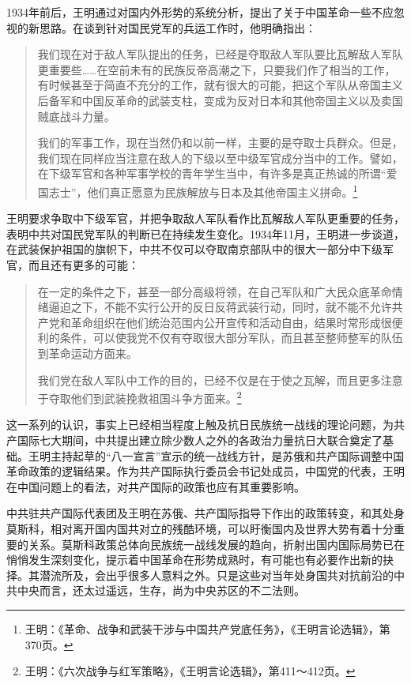 1934年前后，王明通过对国内外形势的系统分析，提出了关于中国革命一些不应忽视的新思路。在谈到针对国民党军的兵运工作时，他明确指出：

\begin{quote}

我们现在对于敌人军队提出的任务，已经是夺取敌人军队要比瓦解敌人军队更重要些……在空前未有的民族反帝高潮之下，只要我们作了相当的工作，有时候甚至于简直不充分的工作，就有很大的可能，把这个军队从帝国主义后备军和中国反革命的武装支柱，变成为反对日本和其他帝国主义以及卖国贼底战斗力量。

我们的军事工作，现在当然仍和以前一样，主要的是夺取士兵群众。但是，我们现在同样应当注意在敌人的下级以至中级军官成分当中的工作。譬如，在下级军官和各种军事学校的青年学生当中，有许多是真正热诚的所谓“爱国志士”，他们真正愿意为民族解放与日本及其他帝国主义拼命。\footnote{王明：《革命、战争和武装干涉与中国共产党底任务》，《王明言论选辑》，第370页。}
\end{quote}


王明要求争取中下级军官，并把争取敌人军队看作比瓦解敌人军队更重要的任务，表明中共对国民党军队的判断已在持续发生变化。1934年11月，王明进一步谈道，在武装保护祖国的旗帜下，中共不仅可以夺取南京部队中的很大一部分中下级军官，而且还有更多的可能：

\begin{quote}

在一定的条件之下，甚至一部分高级将领，在自己军队和广大民众底革命情绪逼迫之下，不能不实行公开的反日反蒋武装行动，同时，就不能不允许共产党和革命组织在他们统治范围内公开宣传和活动自由，结果时常形成很便利的条件，可以使我党不仅有夺取很大部分军队，而且甚至整师整军的队伍到革命运动方面来。

我们党在敌人军队中工作的目的，已经不仅是在于使之瓦解，而且更多注意于夺取他们到武装挽救祖国斗争方面来。\footnote{王明：《六次战争与红军策略》，《王明言论选辑》，第411～412页。}
\end{quote}


这一系列的认识，事实上已经相当程度上触及抗日民族统一战线的理论问题，为共产国际七大期间，中共提出建立除少数人之外的各政治力量抗日大联合奠定了基础。王明主持起草的“八一宣言”宣示的统一战线方针，是苏俄和共产国际调整中国革命政策的逻辑结果。作为共产国际执行委员会书记处成员，中国党的代表，王明在中国问题上的看法，对共产国际的政策也应有其重要影响。


中共驻共产国际代表团及王明在苏俄、共产国际指导下作出的政策转变，和其处身莫斯科，相对离开国内国共对立的残酷环境，可以盱衡国内及世界大势有着十分重要的关系。莫斯科政策总体向民族统一战线发展的趋向，折射出国内国际局势已在悄悄发生深刻变化，提示着中国革命在形势成熟时，有可能也有必要作出新的抉择。其潜流所及，会出乎很多人意料之外。只是这些对当年处身国共对抗前沿的中共中央而言，还太过遥远，生存，尚为中央苏区的不二法则。

